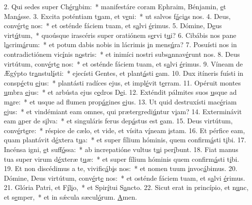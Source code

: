 2. Qui sedes super Ch\uline{é}r\uline{u}bim:~* manifestáre coram Ephraim, Bénjamin, \uline{e}t Man\uline{á}sse.
3. Excita poténtiam t\uline{u}am, et v\uline{e}ni:~* ut salvos f\uline{á}ci\uline{a}s nos.
4. Deus, conv\uline{é}rt\uline{e} nos:~* et osténde fáciem tuam, et s\uline{a}lvi \uline{é}rimus.
5. Dómine, D\uline{e}us virt\uline{ú}tum,~* quoúsque irascéris super oratiónem s\uline{e}rvi t\uline{u}i?
6. Cibábis nos pane l\uline{a}crim\uline{á}rum:~* et potum dabis nobis in lácrimis \uline{i}n mens\uline{ú}ra?
7. Posuísti nos in contradictiónem vic\uline{í}nis n\uline{o}stris:~* et inimíci nostri subs\uline{a}nnav\uline{é}runt nos.
8. Deus virtútum, conv\uline{é}rt\uline{e} nos:~* et osténde fáciem tuam, et s\uline{a}lvi \uline{é}rimus.
9. Víneam de Ægýpto tr\uline{a}nstul\uline{í}sti:~* ejecísti Gentes, et plant\uline{á}sti \uline{e}am.
10. Dux itíneris fuísti in consp\uline{é}ctu \uline{e}jus:~* plantásti radíces ejus, et impl\uline{é}vit t\uline{e}rram.
11. Opéruit montes \uline{u}mbra \uline{e}jus:~* et arbústa ejus c\uline{e}dros D\uline{e}i.
12. Exténdit pálmites suos \uline{u}sque ad m\uline{a}re:~* et usque ad flumen prop\uline{á}gines \uline{e}jus.
13. Ut quid destruxísti mac\uline{é}riam \uline{e}jus:~* et vindémiant eam omnes, qui prætergredi\uline{ú}ntur v\uline{i}am?
14. Exterminávit eam \uline{a}per de s\uline{i}lva:~* et singuláris ferus dep\uline{á}stus est \uline{e}am.
15. Deus virtútum, conv\uline{é}rt\uline{e}re:~* réspice de cælo, et vide, et vísita v\uline{í}neam \uline{i}stam.
16. Et pérfice eam, quam plantávit d\uline{é}xtera t\uline{u}a:~* et super fílium hóminis, quem confirm\uline{á}sti t\uline{i}bi.
17. Incénsa igni, \uline{e}t suff\uline{ó}ssa:~* ab increpatióne vultus t\uline{u}i per\uline{í}bunt.
18. Fiat manus tua super virum d\uline{é}xteræ t\uline{u}æ:~* et super fílium hóminis quem confirm\uline{á}sti t\uline{i}bi.
19. Et non discédimus a te, vivific\uline{á}b\uline{i}s nos:~* et nomen tuum \uline{i}nvoc\uline{á}bimus.
20. Dómine, Deus virtútum, conv\uline{é}rt\uline{e} nos:~* et osténde fáciem tuam, et s\uline{a}lvi \uline{é}rimus.
21. Glória Patri, et F\uline{í}l\uline{i}o,~* et Spir\uline{í}tui S\uline{a}ncto.
22. Sicut erat in princípio, et n\uline{u}nc, et s\uline{e}mper,~* et in sǽcula sæcul\uline{ó}rum. \uline{A}men.
